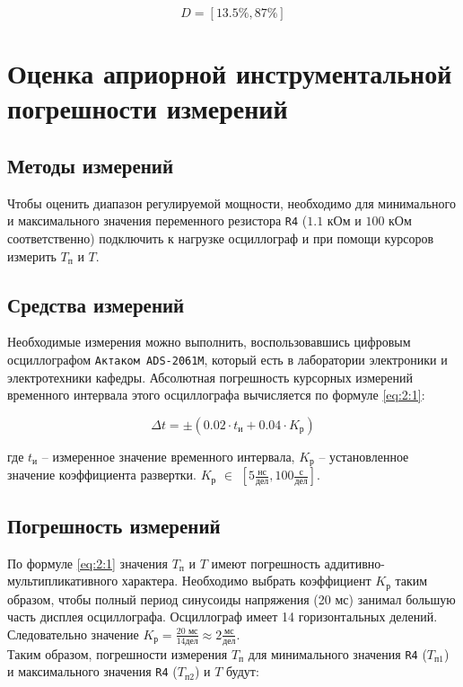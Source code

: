 \begin{displaymath}
	D = [13.5\%, 87\%]
\end{displaymath}

\section{Оценка априорной инструментальной погрешности измерений}

\subsection{Методы измерений}

Чтобы оценить диапазон регулируемой мощности, необходимо для минимального и максимального значения переменного резистора \verb+R4+ ($1.1$ кОм и $100$ кОм соответственно) подключить к нагрузке осциллограф и при помощи курсоров измерить $T_\text{п}$ и $T$.

\subsection{Средства измерений}

Необходимые измерения можно выполнить, воспользовавшись цифровым осциллографом \verb+Актаком ADS-2061M+, который есть в лаборатории электроники и электротехники кафедры. Абсолютная погрешность курсорных измерений временного интервала этого осциллографа вычисляется по формуле \ref{eq:2:1}:

\begin{equation}
\label{eq:2:1}
	\Delta t = \pm \left(0.02 \cdot t_{\text{и}} + 0.04 \cdot K_{\text{р}} \right)
\end{equation}

\noindent где $t_{\text{и}}$ -- измеренное значение временного интервала, $K_{\text{р}}$ -- установленное значение коэффициента развертки. $K_{\text{р}}$ $\in$ $\left[5 \frac{\text{нс}}{\text{дел}} , 100 \frac{\text{с}}{\text{дел}}\right]$.%

\subsection{Погрешность измерений}

По формуле \ref{eq:2:1} значения $T_{\text{п}}$ и $T$ имеют погрешность аддитивно-мультипликативного характера. Необходимо выбрать коэффициент $K_{\text{р}}$ таким образом, чтобы полный период синусоиды напряжения (20 мс) занимал большую часть дисплея осциллографа. Осциллограф имеет 14 горизонтальных делений. Следовательно значение $K_{\text{р}} = \frac{20 \text{ мс}}{14 \text{дел}} \approx 2 \frac{\text{мс}}{\text{дел}}$.\\\noindent Таким образом, погрешности измерения $T_{\text{п}}$ для минимального значения \verb+R4+ ($T_{\text{п1}}$) и максимального значения \verb+R4+ ($T_{\text{п2}}$) и $T$ будут:

